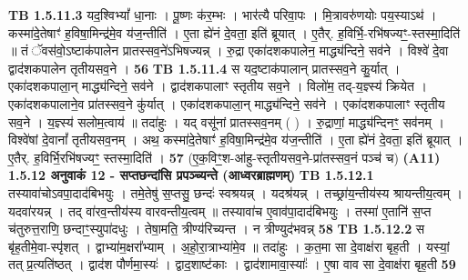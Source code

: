 \documentclass[17pt]{extarticle}
\begin{document}
                                \textbf{ TB 1.5.11.3} \newline
                  यद॒श्विभ्यां᳚ धा॒नाः । पू॒ष्णः क॑र॒म्भः । भार॑त्यै परिवा॒पः । मि॒त्रावरु॑णयोः पय॒स्याऽथ॑ । कस्मा॑दे॒तेषाꣳ॑ ह॒विषा॒मिन्द्र॑मे॒व य॑ज॒न्तीति॑ । ए॒ता ह्ये॑नं दे॒वता॒ इति॑ ब्रूयात् । ए॒तैर्. ह॒विर्भि॒-रभि॑षज्यꣳ॒॒-स्तस्मा॒दिति॑ ॥ तं ॅवस॑वो॒ऽष्टाक॑पालेन प्रातस्सव॒ने॑ऽभिषज्यन्न् । रु॒द्रा एका॑दशकपालेन॒ माद्ध्य॑न्दिने॒ सव॑ने । विश्वे॑ दे॒वा द्वाद॑शकपालेन तृतीयसव॒ने । \textbf{ 56} \newline
                  \newline
                                \textbf{ TB 1.5.11.4} \newline
                  स यद॒ष्टाक॑पालान् प्रातस्सव॒ने कु॒र्यात् । एका॑दशकपाला॒न् माद्ध्य॑न्दिने॒ सव॑ने । द्वाद॑शकपालाꣳ स्तृतीय सव॒ने । विलो॑म॒ तद्-य॒ज्ञ्स्य॑ क्रियेत । एका॑दशकपालाने॒व प्रा॑तस्सव॒ने कु॑र्यात् । एका॑दशकपाला॒न् माद्ध्य॑न्दिने॒ सव॑ने । एका॑दशकपालाꣳ स्तृतीय सव॒ने । य॒ज्ञ्स्य॑ सलोम॒त्वाय॑ ॥ तदा॑हुः । यद् वसू॑नां प्रातस्सव॒नम् ( ) । रु॒द्राणां॒ माद्ध्य॑न्दिनꣳ॒॒ सव॑नम् । विश्वे॑षां दे॒वानां᳚ तृतीयसव॒नम् । अथ॒ कस्मा॑दे॒तेषाꣳ॑ ह॒विषा॒मिन्द्र॑मे॒व य॑ज॒न्तीति॑ । ए॒ता ह्ये॑नं दे॒वता॒ इति॑ ब्रूयात् । ए॒तैर्. ह॒विर्भि॒रभि॑षज्यꣳ॒॒ स्तस्मा॒दिति॑ । \textbf{ 57} \newline
                  \newline
                                    (ए॒क॒विꣳ॒॒श-आ॑हु-स्तृतीयसव॒ने-प्रा॑तस्सव॒नं पञ्च॑ च) \textbf{(A11)} \newline \newline
                \textbf{ 1.5.12    अनुवाकं   12 - सप्तछन्दांसि प्रपञ्च्यन्ते (आध्वरब्राह्मणम्)} \newline
                                \textbf{ TB 1.5.12.1} \newline
                  तस्यावा॑चोऽवपा॒दाद॑बिभयुः । तमे॒तेषु॑ स॒प्तसु॒ छन्दः॑ स्वश्रयन्न् । यदश्र॑यन्न् । तच्छ्रा॑य॒न्तीय॑स्य श्रायन्तीय॒त्वम् । यदवा॑रयन्न् । तद् वा॑रव॒न्तीय॑स्य वारवन्तीय॒त्वम् ॥ तस्यावा॑च ए॒वाव॑पा॒दाद॑बिभयुः । तस्मा॑ ए॒तानि॑ स॒प्त च॑तुरुत्त॒राणि॒ छन्दाꣳ॒॒स्युपा॑दधुः । तेषा॒मति॒ त्रीण्य॑रिच्यन्त । न त्रीण्युद॑भवन्न् \textbf{ 58} \newline
                  \newline
                                \textbf{ TB 1.5.12.2} \newline
                  स बृ॑ह॒तीमे॒वा-स्पृ॑शत् । द्वाभ्या॑म॒क्षरा᳚भ्याम् । अ॒हो॒रा॒त्राभ्या॑मे॒व ॥ तदा॑हुः । क॒त॒मा सा दे॒वाक्ष॑रा बृह॒ती । यस्यां॒ तत् प्र॒त्यति॑ष्ठत् । द्वाद॑श पौर्णमा॒स्यः॑ । द्वाद॒शाष्ट॑काः । द्वाद॑शामावा॒स्याः᳚ । ए॒षा वाव सा दे॒वाक्ष॑रा बृह॒ती \textbf{ 59} \newline
\end{document}
